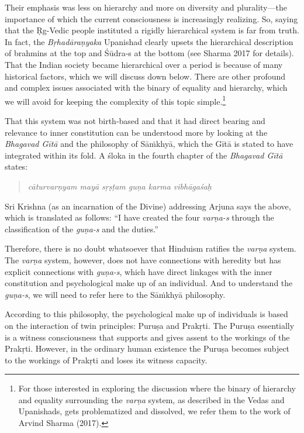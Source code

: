Their emphasis was less on hierarchy and more on diversity and plurality—the importance of which the current consciousness is increasingly realizing. So, saying that the Ṛg-Vedic people instituted a rigidly hierarchical system is far from truth. In fact, the \textit{Bṛhadāraṇyaka} Upanishad clearly upsets the hierarchical description of brahmins at the top and Śūdra-s at the bottom (see Sharma 2017 for details). That the Indian society became hierarchical over a period is because of many historical factors, which we will discuss down below. There are other profound and complex issues associated with the binary of equality and hierarchy, which we will avoid for keeping the complexity of this topic simple.\footnote{For those interested in exploring the discussion where the binary of hierarchy and equality surrounding the \textit{varṇa} 	system, as described in the Vedas and Upanishads, gets problematized and dissolved, we refer them to the work of Arvind Sharma (2017).}

That this system was not birth-based and that it had direct bearing and relevance to inner constitution can be understood more by looking at the \textit{Bhagavad Gītā} and the philosophy of Sāṁkhyā, which the Gītā is stated to have integrated within its fold. A śloka in the fourth chapter of the \textit{Bhagavad Gītā} states:
\begin{quote}
\textit{cāturvarṇyam mayā sṛṣṭam guṇa karma vibhāgaśaḥ} 
\end{quote}
Sri Krishna (as an incarnation of the Divine) addressing Arjuna says the above, which is translated as follows: “I have created the four \textit{varṇa-s} through the classification of the \textit{guṇa-s} and the duties.”

Therefore, there is no doubt whatsoever that Hinduism ratifies the \textit{varṇa} system. The \textit{varṇa} system, however, does not have connections with heredity but has explicit connections with \textit{guṇa-s},  which have direct linkages with the inner constitution and psychological make up of an individual. And to understand the \textit{guṇa-s},  we will need to refer here to the Sāṁkhyā philosophy. 

According to this philosophy, the psychological make up of individuals is based on the interaction of twin principles: Puruṣa and Prakṛti. The Puruṣa essentially is a witness consciousness that supports and gives assent to the workings of the Prakṛti. However, in the ordinary human existence the Puruṣa becomes subject to the workings of Prakṛti and loses its witness capacity. 

